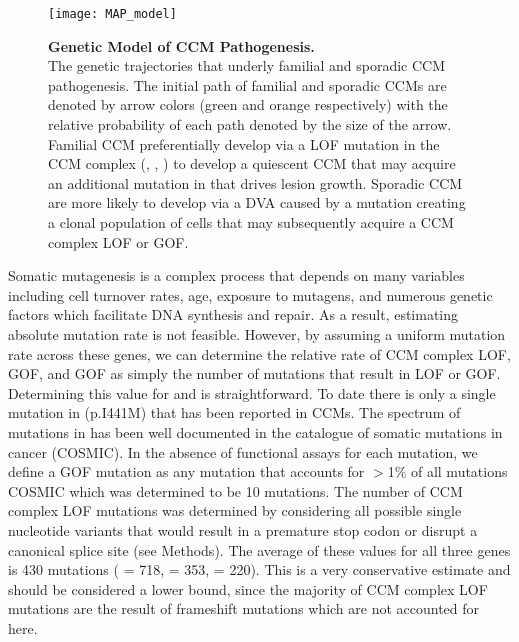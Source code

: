 \begin{figure}[h!]
\centering
\texttt{[image: MAP\_model]}
\caption[Genetic Model of CCM Pathogenesis]{\textbf{Genetic Model of CCM Pathogenesis. \\} 
The genetic trajectories that underly familial and sporadic CCM pathogenesis. The initial path of familial and sporadic CCMs are denoted by arrow colors (green and orange respectively) with the relative probability of each path denoted by the size of the arrow. Familial CCM preferentially develop via a LOF mutation in the CCM complex (, , ) to develop a quiescent CCM that may acquire an additional mutation in  that drives lesion growth. Sporadic CCM are more likely to develop via a DVA caused by a  mutation creating a clonal population of cells that may subsequently acquire a CCM complex LOF or  GOF. }

\label{MAP_model}
\end{figure}

Somatic mutagenesis is a complex process that depends on many variables including cell turnover rates, age, exposure to mutagens, and numerous genetic factors which facilitate DNA synthesis and repair. As a result, estimating absolute mutation rate is not feasible. However, by assuming a uniform mutation rate across these genes, we can determine the relative rate of CCM complex LOF,  GOF, and  GOF as simply the number of mutations that result in LOF or GOF. Determining this value for  and  is straightforward. To date there is only a single mutation in  (p.I441M) that has been reported in CCMs. The spectrum of mutations in  has been well documented in the catalogue of somatic mutations in cancer (COSMIC). In the absence of functional assays for each mutation, we define a GOF mutation as any mutation that accounts for $>$1\% of all  mutations COSMIC which was determined to be 10 mutations. The number of CCM complex LOF mutations was determined by considering all possible single nucleotide variants that would result in a premature stop codon or disrupt a canonical splice site (see Methods). The average of these values for all three genes is 430 mutations ( = 718,  = 353,  = 220). This is a very conservative estimate and should be considered a lower bound, since the majority of CCM complex LOF mutations are the result of frameshift mutations which are not accounted for here. 

